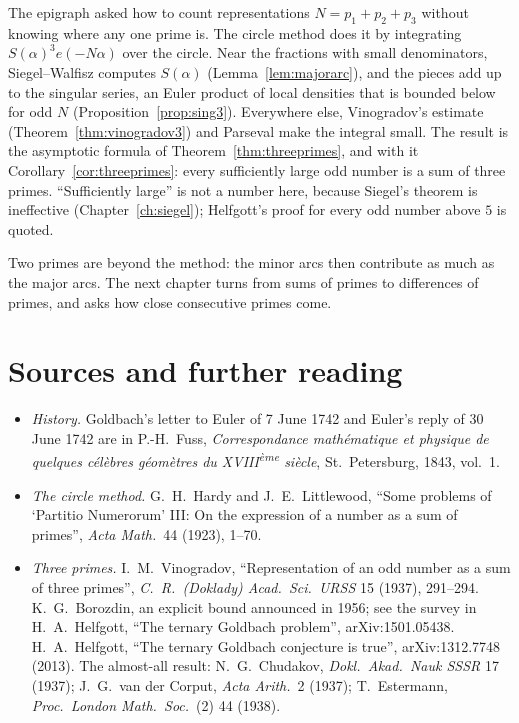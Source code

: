 The epigraph asked how to count representations $N=p_1+p_2+p_3$ without knowing where any one prime is. The circle method does it by integrating $S(\alpha)^3e(-N\alpha)$ over the circle. Near the fractions with small denominators, Siegel--Walfisz computes $S(\alpha)$ (Lemma~\ref{lem:majorarc}), and the pieces add up to the singular series, an Euler product of local densities that is bounded below for odd $N$ (Proposition~\ref{prop:sing3}). Everywhere else, Vinogradov's estimate (Theorem~\ref{thm:vinogradov3}) and Parseval make the integral small. The result is the asymptotic formula of Theorem~\ref{thm:threeprimes}, and with it Corollary~\ref{cor:threeprimes}: every sufficiently large odd number is a sum of three primes. ``Sufficiently large'' is not a number here, because Siegel's theorem is ineffective (Chapter~\ref{ch:siegel}); Helfgott's proof for every odd number above $5$ is quoted.

Two primes are beyond the method: the minor arcs then contribute as much as the major arcs. The next chapter turns from sums of primes to differences of primes, and asks how close consecutive primes come.

\section*{Sources and further reading}

\begin{itemize}
\item \emph{History.} Goldbach's letter to Euler of 7 June 1742 and Euler's reply of 30 June 1742 are in P.-H.~Fuss, \emph{Correspondance mathématique et physique de quelques célèbres géomètres du XVIII\textsuperscript{ème} siècle}, St.\ Petersburg, 1843, vol.~1.
\item \emph{The circle method.} G.~H.~Hardy and J.~E.~Littlewood, ``Some problems of `Partitio Numerorum' III: On the expression of a number as a sum of primes'', \emph{Acta Math.}\ 44 (1923), 1--70.
\item \emph{Three primes.} I.~M.~Vinogradov, ``Representation of an odd number as a sum of three primes'', \emph{C.\ R.\ (Doklady) Acad.\ Sci.\ URSS} 15 (1937), 291--294. K.~G.~Borozdin, an explicit bound announced in 1956; see the survey in H.~A.~Helfgott, ``The ternary Goldbach problem'', arXiv:1501.05438. H.~A.~Helfgott, ``The ternary Goldbach conjecture is true'', arXiv:1312.7748 (2013). The almost-all result: N.~G.~Chudakov, \emph{Dokl.\ Akad.\ Nauk SSSR} 17 (1937); J.~G.~van der Corput, \emph{Acta Arith.}\ 2 (1937); T.~Estermann, \emph{Proc.\ London Math.\ Soc.}\ (2) 44 (1938).
\end{itemize}

